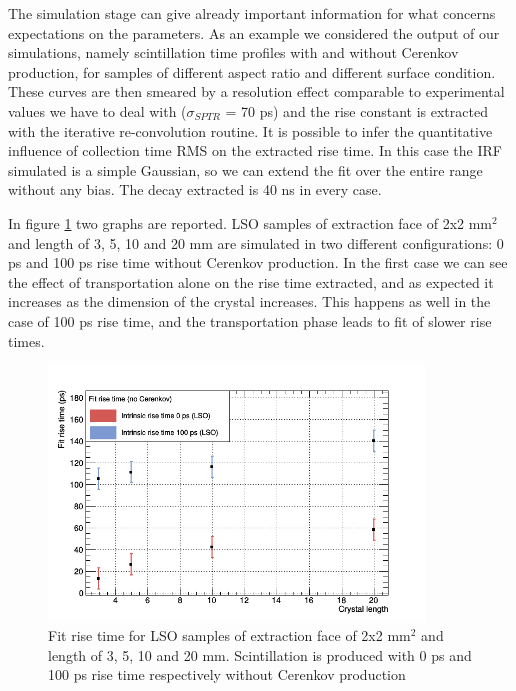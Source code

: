 The simulation stage can give already important information for what concerns expectations on the parameters. As an example we considered the output of our simulations, namely scintillation time profiles with and without Cerenkov production, for samples of different aspect ratio and different surface condition. These curves are then smeared by a resolution effect comparable to experimental values we have to deal with ($\sigma _{SPTR}$ = 70 ps) and the rise constant is extracted with the iterative re-convolution routine. It is possible to infer the quantitative influence of collection time RMS on the extracted rise time. In this case the IRF simulated is a simple Gaussian, so we can extend the fit over the entire range without any bias. The decay extracted is 40 ns in every case.

In figure \ref{fig:rise_no_cer} two graphs are reported. LSO samples of extraction face of 2x2 mm$^{2}$ and length of 3, 5, 10 and 20 mm are simulated in two different configurations: 0 ps and 100 ps rise time without Cerenkov production.
In the first case we can see the effect of transportation alone on the rise time extracted, and as expected it increases as the dimension of the crystal increases.
This happens as well in the case of 100 ps rise time, and the transportation phase leads to fit of slower rise times.
\begin{figure}[htbp]
\begin{center}
\includegraphics[width=10cm]{../Pictures/Chapter_6/file_without_cer.png}
\end{center}
\caption[Extracted rise time for 0 and 100 ps intrinsic rise time]{Fit rise time for LSO samples of extraction face of 2x2 mm$^{2}$ and length of 3, 5, 10 and 20 mm. Scintillation is produced with 0 ps and 100 ps rise time respectively without Cerenkov production}
\label{fig:rise_no_cer}
\end{figure}
